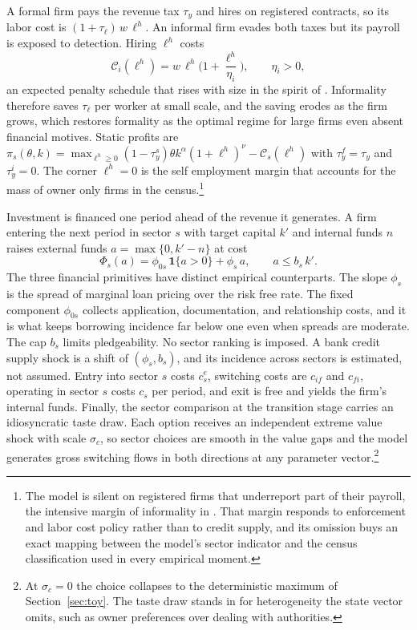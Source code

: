 \documentclass[12pt]{article}
\begin{document}
A formal firm pays the revenue tax $\tau_{y}$ and hires on registered contracts, so its labor cost is $(1+\tau_{\ell})\,w\,\ell^{h}$. An informal firm evades both taxes but its payroll is exposed to detection. Hiring $\ell^{h}$ costs
\begin{equation}
  \mathcal{C}_{i}(\ell^{h})=w\,\ell^{h}\Big(1+\frac{\ell^{h}}{\eta_{i}}\Big),
  \qquad \eta_{i}>0,
  \label{eq:gen-Ci}
\end{equation}
an expected penalty schedule that rises with size in the spirit of \citet{ulyssea2018firms}. Informality therefore saves $\tau_{\ell}$ per worker at small scale, and the saving erodes as the firm grows, which restores formality as the optimal regime for large firms even absent financial motives. Static profits are $\pi_{s}(\theta,k)=\max_{\ell^{h}\geq0}(1-\tau_{y}^{s})\theta k^{\alpha}(1+\ell^{h})^{\nu}-\mathcal{C}_{s}(\ell^{h})$ with $\tau_{y}^{f}=\tau_{y}$ and $\tau_{y}^{i}=0$. The corner $\ell^{h}=0$ is the self employment margin that accounts for the mass of owner only firms in the census.\footnote{The model is silent on registered firms that underreport part of their payroll, the intensive margin of informality in \citet{ulyssea2018firms}. That margin responds to enforcement and labor cost policy rather than to credit supply, and its omission buys an exact mapping between the model's sector indicator and the census classification used in every empirical moment.}

Investment is financed one period ahead of the revenue it generates. A firm entering the next period in sector $s$ with target capital $k'$ and internal funds $n$ raises external funds $a=\max\{0,k'-n\}$ at cost
\begin{equation}
  \Phi_{s}(a)=\phi_{0s}\,\mathbf{1}\{a>0\}+\phi_{s}\,a,
  \qquad
  a\leq b_{s}\,k'.
  \label{eq:gen-fincost}
\end{equation}
The three financial primitives have distinct empirical counterparts. The slope $\phi_{s}$ is the spread of marginal loan pricing over the risk free rate. The fixed component $\phi_{0s}$ collects application, documentation, and relationship costs, and it is what keeps borrowing incidence far below one even when spreads are moderate. The cap $b_{s}$ limits pledgeability. No sector ranking is imposed. A bank credit supply shock is a shift of $(\phi_{s},b_{s})$, and its incidence across sectors is estimated, not assumed. Entry into sector $s$ costs $c^{e}_{s}$, switching costs are $c_{if}$ and $c_{fi}$, operating in sector $s$ costs $c_{s}$ per period, and exit is free and yields the firm's internal funds. Finally, the sector comparison at the transition stage carries an idiosyncratic taste draw. Each option receives an independent extreme value shock with scale $\sigma_{c}$, so sector choices are smooth in the value gaps and the model generates gross switching flows in both directions at any parameter vector.\footnote{At $\sigma_{c}=0$ the choice collapses to the deterministic maximum of Section~\ref{sec:toy}. The taste draw stands in for heterogeneity the state vector omits, such as owner preferences over dealing with authorities.}
\end{document}
